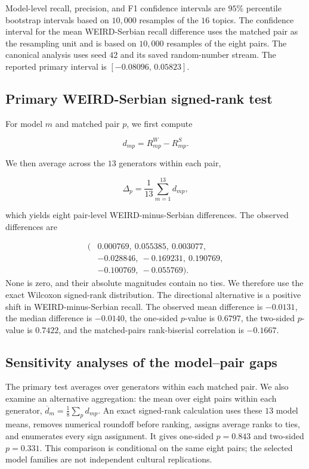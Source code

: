 \documentclass[11pt,a4paper]{article}
\begin{document}
Model-level recall, precision, and F1 confidence intervals are $95$\% percentile bootstrap intervals based on $10,000$ resamples of the $16$ topics. The confidence interval for the mean WEIRD-Serbian recall difference uses the matched pair as the resampling unit and is based on $10,000$ resamples of the eight pairs. The canonical analysis uses seed $42$ and its saved random-number stream. The reported primary interval is $[-0.08096,\,0.05823]$.

\subsection{Primary WEIRD-Serbian signed-rank test}
\label{app:primary_wilcoxon}

For model $m$ and matched pair $p$, we first compute

\begin{equation}
 d_{mp}=R^W_{mp}-R^S_{mp}.
\end{equation}

We then average across the $13$ generators within each pair,

\begin{equation}
 \Delta_p=\frac{1}{13}\sum_{m=1}^{13} d_{mp},
\end{equation}

which yields eight pair-level WEIRD-minus-Serbian differences. The observed differences are

\[
\begin{aligned}
(&0.000769,\ 0.055385,\ 0.003077,\\
 &-0.028846,\ -0.169231,\ 0.190769,\\
 &-0.100769,\ -0.055769).
\end{aligned}
\]
None is zero, and their absolute magnitudes contain no ties. We therefore use the exact Wilcoxon signed-rank distribution. The directional alternative is a positive shift in WEIRD-minus-Serbian recall. The observed mean difference is $-0.0131$, the median difference is $-0.0140$, the one-sided $p$-value is $0.6797$, the two-sided $p$-value is $0.7422$, and the matched-pairs rank-biserial correlation is $-0.1667$.


\subsection{Sensitivity analyses of the model--pair gaps}
\label{app:gap-sensitivity}
The primary test averages over generators within each matched pair. We also examine an alternative aggregation: the mean over eight pairs within each generator, $\overline d_m=\frac18\sum_p d_{mp}$. An exact signed-rank calculation uses these $13$ model means, removes numerical roundoff before ranking, assigns average ranks to ties, and enumerates every sign assignment. It gives one-sided $p=0.843$ and two-sided $p=0.331$. This comparison is conditional on the same eight pairs; the selected model families are not independent cultural replications.
\end{document}
